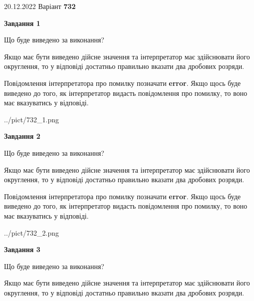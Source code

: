 \documentclass[12pt, ukrainian]{article}
\begin{document}
{20.12.2022 Варіант \No \textbf { 732 }\par}
{
\begin {Large}

{\begin {center}\textbf{Завдання 1}\end {center}}\par
Що буде виведено за виконання? \par

Якщо має бути виведено дійсне значення та інтерпретатор має здійснювати його округлення, 
то у відповіді достатньо правильно вказати два дробових розряди.

Повідомлення інтерпретатора про помилку позначати \textbf{error}.
Якщо щось буде виведено до того, як інтерпретатор видасть повідомлення про помилку, 
то воно має вказуватись у відповіді. \par

\begin{center}
	{../pict/732_1.png}
\end{center}
\newpage

{\begin {center}\textbf{Завдання 2}\end {center}}\par
Що буде виведено за виконання? \par

Якщо має бути виведено дійсне значення та інтерпретатор має здійснювати його округлення, 
то у відповіді достатньо правильно вказати два дробових розряди.

Повідомлення інтерпретатора про помилку позначати \textbf{error}.
Якщо щось буде виведено до того, як інтерпретатор видасть повідомлення про помилку, 
то воно має вказуватись у відповіді. \par

\begin{center}
	{../pict/732_2.png}
\end{center}
\newpage

{\begin {center}\textbf{Завдання 3}\end {center}}\par
Що буде виведено за виконання? \par

Якщо має бути виведено дійсне значення та інтерпретатор має здійснювати його округлення, 
то у відповіді достатньо правильно вказати два дробових розряди.


\end{Large}}
\end{document}
